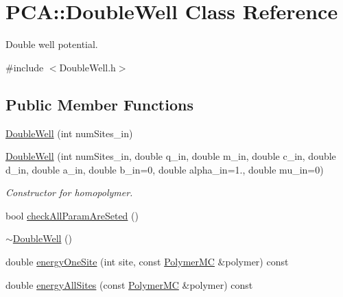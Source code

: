 \hypertarget{class_p_c_a_1_1_double_well}{}\section{P\+CA\+:\+:Double\+Well Class Reference}
\label{class_p_c_a_1_1_double_well}


Double well potential.  




{\ttfamily \#include $<$Double\+Well.\+h$>$}

\subsection*{Public Member Functions}
\begin{DoxyCompactItemize}
\item 
\hyperlink{class_p_c_a_1_1_double_well_a2da334045b5aba1c8c9df629f9d125e6}{Double\+Well} (int num\+Sites\+\_\+in)
\item 
\hyperlink{class_p_c_a_1_1_double_well_ac5ccee874cdab2d303f76b99311ee291}{Double\+Well} (int num\+Sites\+\_\+in, double q\+\_\+in, double m\+\_\+in, double c\+\_\+in, double d\+\_\+in, double a\+\_\+in, double b\+\_\+in=0, double alpha\+\_\+in=1., double mu\+\_\+in=0)
\begin{DoxyCompactList}\small\item\em Constructor for homopolymer. \end{DoxyCompactList}\item 
bool \hyperlink{class_p_c_a_1_1_double_well_ac77ffe1350084b4037d9a36abfb6cf9b}{check\+All\+Param\+Are\+Seted} ()
\item 
\hyperlink{class_p_c_a_1_1_double_well_a0cac56024b17d2aa95468c9c3145eca9}{$\sim$\+Double\+Well} ()
\item 
double \hyperlink{class_p_c_a_1_1_double_well_a919d4cfd87c1eebeae8a4d305380681f}{energy\+One\+Site} (int site, const \hyperlink{class_p_c_a_1_1_polymer_m_c}{Polymer\+MC} \&polymer) const
\item 
double \hyperlink{class_p_c_a_1_1_double_well_a35be7be79cb922e39b0239d92f6abac1}{energy\+All\+Sites} (const \hyperlink{class_p_c_a_1_1_polymer_m_c}{Polymer\+MC} \&polymer) const
\end{DoxyCompactItemize}
